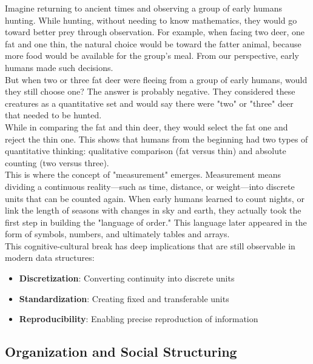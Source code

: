 Imagine returning to ancient times and observing a group of early humans hunting. While hunting, without needing to know mathematics, they would go toward better prey through observation. For example, when facing two deer, one fat and one thin, the natural choice would be toward the fatter animal, because more food would be available for the group's meal. From our perspective, early humans made such decisions.\\
But when two or three fat deer were fleeing from a group of early humans, would they still choose one? The answer is probably negative. They considered these creatures as a quantitative set and would say there were "two" or "three" deer that needed to be hunted.\\
While in comparing the fat and thin deer, they would select the fat one and reject the thin one. This shows that humans from the beginning had two types of quantitative thinking: qualitative comparison (fat versus thin) and absolute counting (two versus three).\\
This is where the concept of "measurement" emerges. Measurement means dividing a continuous reality—such as time, distance, or weight—into discrete units that can be counted again. When early humans learned to count nights, or link the length of seasons with changes in sky and earth, they actually took the first step in building the "language of order." This language later appeared in the form of symbols, numbers, and ultimately tables and arrays.\\
This cognitive-cultural break has deep implications that are still observable in modern data structures:

\begin{itemize}
	\item \textbf{Discretization}: Converting continuity into discrete units
	\item \textbf{Standardization}: Creating fixed and transferable units
	\item \textbf{Reproducibility}: Enabling precise reproduction of information
\end{itemize}

\subsection{Organization and Social Structuring}

